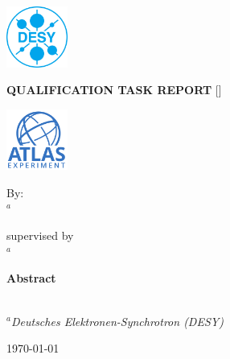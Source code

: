 \begin{titlepage}
	
	\begin{center}
		\includegraphics[width=0.15\textwidth]{Figures/Logos/DESY-Logo-cyan-RGB_ger.jpg}
		\hfill
		\begin{minipage}[ct!]{0.6\linewidth}
			\centering
			\vspace{-2cm}
			\Large\textbf {QUALIFICATION TASK REPORT}\vspace{0.5cm}
			\Large {[\draft\space\version]}
		\end{minipage}
		\hfill
		\includegraphics[width=0.15\textwidth]{Figures/Logos/AT_atlaslogo_2015.pdf}
	\end{center}
	\vfill
	
	\begin{center}
		\huge \textbf{\qttitle}
	\end{center}
	\vfill
	
	\begin{center}
		\Large {By: \\ \me\space$^{a}$}
	\end{center}
	\vfill
	
	\begin{center}
		\Large {supervised by \\ \supervisor\space$^{a}$}
	\end{center}
	\vfill
		
	\begin{center}
		\large \textbf{Abstract}
	\end{center}
	
	\large \qtabstract
	\vfill
		
	\hspace{-0.7cm} \xdash[12em] \\
	\textit{$^{a}$\space Deutsches Elektronen-Synchrotron (DESY)}
	
	\begin{center}
		{\large \usdate \today }
	\end{center}
\end{titlepage}